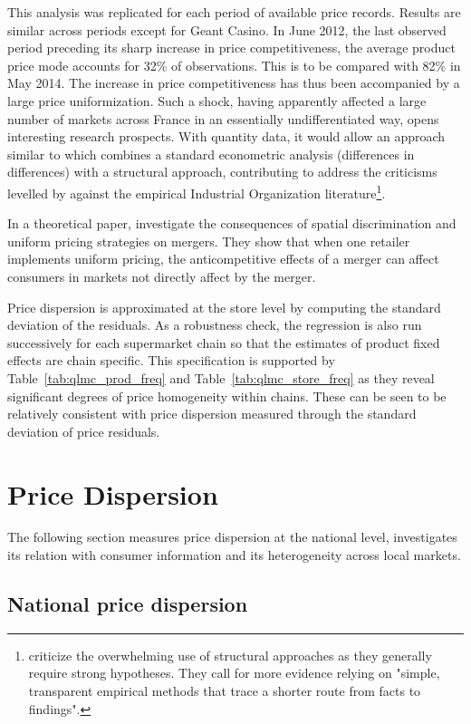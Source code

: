 \documentclass[english]{article}
\begin{document}
This analysis was replicated for each period of available price records. Results are similar across periods except for Geant Casino. In June 2012, the last observed period preceding its sharp increase in price competitiveness, the average product price mode accounts for 32\% of observations. This is to be compared with 82\% in May 2014. The increase in price competitiveness has thus been accompanied by a large price uniformization. Such a shock, having apparently affected a large number of markets across France in an essentially undifferentiated way, opens interesting research prospects. With quantity data, it would allow an approach similar to \cite{ALL16b} which combines a standard econometric analysis (differences in differences) with a structural approach, contributing to address the criticisms levelled by \cite{ANG10} against the empirical Industrial Organization literature\footnote{\cite{ANG10} criticize the overwhelming use of structural approaches as they generally require strong hypotheses. They call for more evidence relying on "simple, transparent empirical methods that trace a shorter route from facts to findings".}.

In a theoretical paper, \cite{ALL16a} investigate the consequences of spatial discrimination and uniform pricing strategies on mergers. They show that when one retailer implements uniform pricing, the anticompetitive effects of a merger can affect consumers in markets not directly affect by the merger.

Price dispersion is approximated at the store level by computing the standard deviation of the residuals. As a robustness check, the regression is also run successively for each supermarket chain so that the estimates of product fixed effects are chain specific. This specification is supported by Table~\ref{tab:qlmc_prod_freq} and Table~\ref{tab:qlmc_store_freq} as they reveal significant degrees of price homogeneity within chains. These can be seen to be relatively consistent with price dispersion measured through the standard deviation of price residuals.

\section{Price Dispersion}

The following section measures price dispersion at the national level, investigates its relation with consumer information and its heterogeneity across local markets.

\subsection{National price dispersion}
\end{document}
